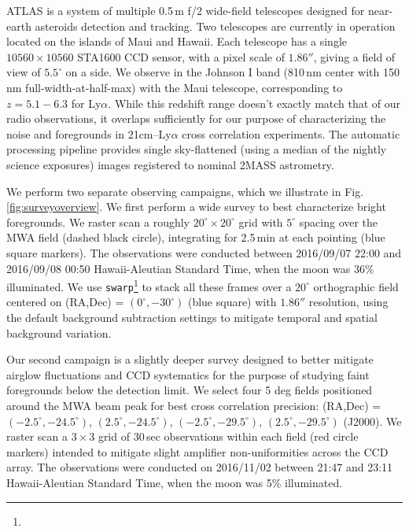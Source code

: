 \documentclass{emulateapj}
\begin{document}
ATLAS is a system of multiple 0.5\,m f/2 wide-field telescopes \citep{tonry11} designed for near-earth asteroids detection and tracking. Two telescopes are currently in operation located on the islands of Maui and Hawaii.   Each telescope has a single $10560\times10560$ STA1600 CCD sensor, with a pixel scale of $1.86''$, giving a field of view of $5.5^\circ$ on a side.  We observe in the Johnson I band (810\,nm center with 150\,nm full-width-at-half-max) with the Maui telescope, corresponding to $z=5.1-6.3$ for Ly$\alpha$.  While this redshift range doesn't exactly match that of our radio observations, it overlaps sufficiently for our purpose of characterizing the noise and foregrounds in 21cm--Ly$\alpha$ cross correlation experiments. The automatic processing pipeline provides single sky-flattened (using a median of the nightly science exposures) images registered to nominal 2MASS astrometry.

We perform two separate observing campaigns, which we illustrate in Fig. \ref{fig:surveyoverview}. We first perform a wide survey to best characterize bright foregrounds. We raster scan a roughly $20^\circ\times20^\circ$ grid with $5^\circ$ spacing over the MWA field (dashed black circle), integrating for 2.5\,min at each pointing (blue square markers). The observations were conducted between 2016/09/07 22:00  and 2016/09/08 00:50 Hawaii-Aleutian Standard Time, when the moon was 36\% illuminated. We use {\tt swarp}\footnote{} \citep{swarp} to stack all these frames over a $20^\circ$ orthographic field centered on (RA,Dec) = $(0^\circ,-30^\circ)$ (blue square) with $1.86''$ resolution, using the default background subtraction settings to mitigate temporal and spatial background variation. 


Our second campaign is a slightly deeper survey designed to better mitigate airglow fluctuations and CCD systematics for the purpose of studying faint foregrounds below the detection limit. We select four 5 deg fields positioned around the MWA beam peak for best cross correlation precision: (RA,Dec) = $(-2.5^\circ, -24.5^\circ)$, $(2.5^\circ, -24.5^\circ)$, $(-2.5^\circ, -29.5^\circ)$, $(2.5^\circ, -29.5^\circ)$ (J2000). We raster scan a $3\times3$ grid of 30\,sec observations within each field (red circle markers) intended to mitigate slight amplifier non-uniformities across the CCD array. The observations were conducted on 2016/11/02 between 21:47 and 23:11 Hawaii-Aleutian Standard Time, when the moon was 5\% illuminated. 
\end{document}
